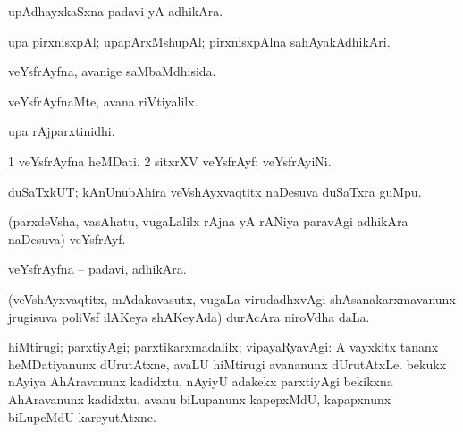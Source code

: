 {{{{{\bentry
{} 
\gl{\nA}
\expl{}
\bmng
 upAdhayxkaSxna padavi yA adhikAra. 
\emng
\eentry

\bentry
{} 
\gl{\nA}
\expl{}
\bmng
 upa pirxnisxpAl; upapArxMshupAl; pirxnisxpAlna sahAyakAdhikAri. 
\emng
\eentry

\bentry
{} 
\gl{\gu}
\expl{}
\bmng
 veYsfrAyfna, avanige saMbaMdhisida. 
\emng
\eentry

\bentry
{} 
\gl{\kirxvi}
\expl{}
\bmng
 veYsfrAyfnaMte, avana riVtiyalilx. 
\emng
\eentry

\bentry
{} 
\gl{\nA}
\expl{}
\bmng
 upa rAjparxtinidhi. 
\emng
\eentry

\bentry
{} 
\gl{\nA}
\expl{}
\bmng
\bnum
\num{1} veYsfrAyfna heMDati. 
\num{2} sitxrXV veYsfrAyf; veYsfrAyiNi. 
\enum
\emng
\eentry

\bentry
{}
\gl{\nA}
\expl{}
\bmng
 duSaTxkUT; kAnUnubAhira veVshAyxvaqtitx naDesuva duSaTxra guMpu. 
\emng
\eentry

\bentry
{} 
\gl{\nA}
\expl{}
\bmng
 (parxdeVsha, vasAhatu, \mo vugaLalilx rAjna yA rANiya paravAgi adhikAra naDesuva) veYsfrAyf. 
\emng
\eentry

\bentry
{} 
\gl{\gu}
\expl{}
\bmng
\emng
\eentry

\bentry
{} 
\gl{\nA}
\expl{}
\bmng
 veYsfrAyfna -- padavi, adhikAra. 
\emng
\eentry

\bentry
{} 
\gl{\nA}
\expl{}
\bmng
\emng
\eentry

\bentry
{} 
\gl{\gu}
\expl{}
\bmng
\emng
\eentry

\bentry
{}
\gl{\nA}
\expl{}
\bmng
 (veVshAyxvaqtitx, mAdakavasutx, \mo vugaLa virudadhxvAgi shAsanakarxmavanunx jrugisuva poliVsf ilAKeya shAKeyAda) durAcAra niroVdha daLa. 
\emng
\eentry

\bentry
{} 
\gl{\kirxvi}
\expl{\Latin}
\bmng
 hiMtirugi; parxtiyAgi; parxtikarxmadalilx; vipayaRyavAgi:  A vayxkitx tananx heMDatiyanunx dUrutAtxne, avaLU hiMtirugi avananunx dUrutAtxLe.  bekukx nAyiya AhAravanunx kadidxtu, nAyiyU adakekx parxtiyAgi bekikxna AhAravanunx kadidxtu.  avanu biLupanunx kapepxMdU, kapapxnunx biLupeMdU kareyutAtxne. 
\emng
\eentry

}}}}}
